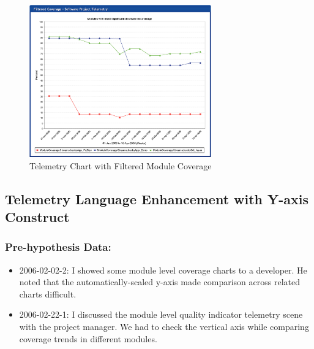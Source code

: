 \begin{figure}[p]
  \center
  \includegraphics[width=0.70\textwidth]{figures/CSDL-FilteredCoverage}
  \caption{Telemetry Chart with Filtered Module Coverage} 
  \label{fig:CSDL-FilteredCoverage}
\end{figure}













\clearpage
\subsection{Telemetry Language Enhancement with Y-axis Construct}
\label{EvaluationInCSDL:EventsDescription:VerticalAxis}

\subsubsection{Pre-hypothesis Data:}
\begin{itemize}
  \setlength{\itemsep}{0pt}
  \setlength{\parskip}{0pt}
  \item 2006-02-02-2: I showed some module level coverage charts to a developer. He noted that the automatically-scaled y-axis made comparison across related charts difficult.
  \item 2006-02-22-1: I discussed the module level quality indicator telemetry scene with the project manager. We had to check the vertical axis while comparing coverage trends in different modules.  
\end{itemize}

